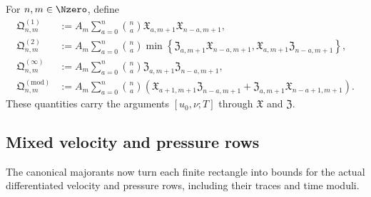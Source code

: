 \begin{definition}
\label{u:def:qc-closed-pressure-majorants}
For \(n,m\in\Nzero\), define
\begin{align}
 \mathfrak Q^{(1)}_{n,m}
 &:={}
 A_m\sum_{a=0}^{n}\binom na
 \mathfrak X_{a,m+1}\mathfrak X_{n-a,m+1},
 \label{u:eq:qc-Q1}\\
 \mathfrak Q^{(2)}_{n,m}
 &:={}
 A_m\sum_{a=0}^{n}\binom na
 \min\left\{
 \mathfrak Z_{a,m+1}\mathfrak X_{n-a,m+1},
 \mathfrak X_{a,m+1}\mathfrak Z_{n-a,m+1}
 \right\},
 \label{u:eq:qc-Q2}\\
 \mathfrak Q^{(\infty)}_{n,m}
 &:={}
 A_m\sum_{a=0}^{n}\binom na
 \mathfrak Z_{a,m+1}\mathfrak Z_{n-a,m+1},
 \label{u:eq:qc-Qinfty}\\
 \mathfrak Q^{(\mathrm{mod})}_{n,m}
 &:={}
 A_m\sum_{a=0}^{n}\binom na
 \left(
 \mathfrak X_{a+1,m+1}\mathfrak Z_{n-a,m+1}
 +\mathfrak Z_{a,m+1}\mathfrak X_{n-a+1,m+1}
 \right).
 \label{u:eq:qc-Qmod}
\end{align}
These quantities carry the arguments \([u_0,\nu;T]\) through
\(\mathfrak X\) and \(\mathfrak Z\).
\end{definition}

\subsection{Mixed velocity and pressure rows}

The canonical majorants now turn each finite rectangle into bounds for the
actual differentiated velocity and pressure rows, including their traces and
time moduli.

